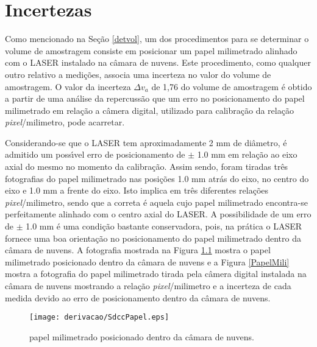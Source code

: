 \doublespacing
\chapter{Incertezas}
\label{cap:incertezas}
Como mencionado na Se\c{c}\~{a}o \ref{detvol}, um dos procedimentos para se determinar o volume de amostragem consiste em posicionar um papel milimetrado alinhado com o LASER instalado na c\^{a}mara de nuvens. Este procedimento, como qualquer outro relativo a medi\c{c}\~{o}es, associa  uma incerteza no valor do volume de amostragem. O valor da incerteza  $\Delta v_a$ de 1,76 do volume de amostragem \'{e} obtido a partir de uma an\'{a}lise da repercuss\~{a}o que um erro no posicionamento do papel milimetrado em rela\c{c}\~{a}o a c\^{a}mera digital, utilizado para calibra\c{c}\~{a}o da rela\c{c}\~{a}o \emph{pixel}/milimetro,  pode acarretar.

Considerando-se que o LASER tem aproximadamente 2 mm de di\^{a}metro, \'{e} admitido um poss\'{\i}vel erro de posicionamento de $\pm$ 1.0 mm em rela\c{c}\~{a}o ao eixo axial do mesmo no momento da calibra\c{c}\~{a}o. Assim sendo, foram tiradas tr\^{e}s fotografias do papel milimetrado nas posi\c{c}\~{o}es 1.0 mm atr\'{a}s do eixo, no centro do eixo e 1.0 mm a frente do eixo. Isto implica em tr\^{e}s diferentes rela\c{c}\~{o}es \emph{pixel}/milimetro, sendo que a correta \'{e} aquela cujo papel milimetrado  encontra-se perfeitamente alinhado com o centro axial do LASER. A possibilidade de um erro de $\pm$ 1.0 mm \'{e} uma  condi\c{c}\~{a}o bastante conservadora, pois, na pr\'{a}tica o LASER fornece uma boa orienta\c{c}\~{a}o no  posicionamento do papel milimetrado dentro da c\^{a}mara de nuvens. A fotografia mostrada na Figura \ref{SdccPapel} mostra o papel milimetrado posicionado dentro da c\^{a}mara de nuvens e a Figura \ref{PapelMili} mostra a fotografia do papel milimetrado tirada pela c\^{a}mera digital instalada na c\^{a}mara de nuvens mostrando a rela\c{c}\~{a}o \emph{pixel}/milimetro e a incerteza de cada medida  devido ao erro de posicionamento dentro da c\^{a}mara de nuvens.

\begin{figure}[hbt]
\begin{center}
\texttt{[image: derivacao/SdccPapel.eps]}\\
\end{center}
\centering \caption{\label{SdccPapel}\hspace{-0.1em} papel milimetrado posicionado dentro da c\^{a}mara de nuvens.}
\end{figure}

